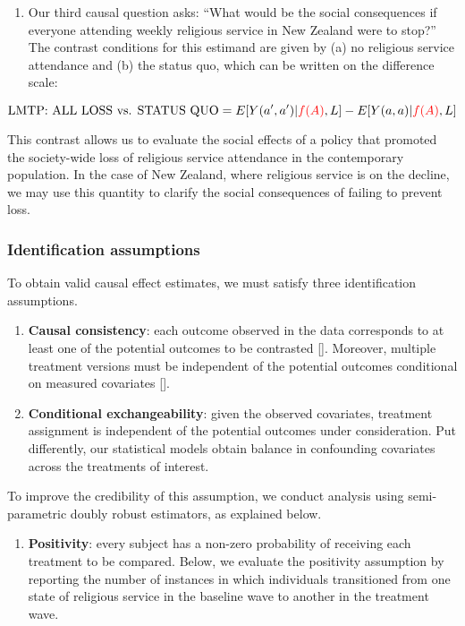 \documentclass[
  single column]{article}
\providecommand{\tightlist}{%
  \setlength{\itemsep}{0pt}\setlength{\parskip}{0pt}}\usepackage{longtable,booktabs,array}
\begin{document}
\begin{enumerate}
\def\labelenumi{\arabic{enumi}.}
\setcounter{enumi}{1}
\tightlist
\item
  Our third causal question asks: ``What would be the social
  consequences if everyone attending weekly religious service in New
  Zealand were to stop?'' The contrast conditions for this estimand are
  given by (a) no religious service attendance and (b) the status quo,
  which can be written on the difference scale:
\end{enumerate}

\[ \text{LMTP: ALL LOSS vs. STATUS QUO}  = E[Y(a^\prime,a^\prime)|\textcolor{red}{f(A)},L] - E[Y(a,a)|\textcolor{red}{f(A)},L] \]

This contrast allows us to evaluate the social effects of a policy that
promoted the society-wide loss of religious service attendance in the
contemporary population. In the case of New Zealand, where religious
service is on the decline, we may use this quantity to clarify the
social consequences of failing to prevent loss.

\subsubsection{Identification
assumptions}\label{identification-assumptions}

To obtain valid causal effect estimates, we must satisfy three
identification assumptions.

\begin{enumerate}
\def\labelenumi{\arabic{enumi}.}
\item
  \textbf{Causal consistency}: each outcome observed in the data
  corresponds to at least one of the potential outcomes to be contrasted
  {[}{]}. Moreover, multiple treatment versions must be independent of
  the potential outcomes conditional on measured covariates {[}{]}.
\item
  \textbf{Conditional exchangeability}: given the observed covariates,
  treatment assignment is independent of the potential outcomes under
  consideration. Put differently, our statistical models obtain balance
  in confounding covariates across the treatments of interest.
\end{enumerate}

To improve the credibility of this assumption, we conduct analysis using
semi-parametric doubly robust estimators, as explained below.

\begin{enumerate}
\def\labelenumi{\arabic{enumi}.}
\setcounter{enumi}{2}
\tightlist
\item
  \textbf{Positivity}: every subject has a non-zero probability of
  receiving each treatment to be compared. Below, we evaluate the
  positivity assumption by reporting the number of instances in which
  individuals transitioned from one state of religious service in the
  baseline wave to another in the treatment wave.
\end{enumerate}
\end{document}
